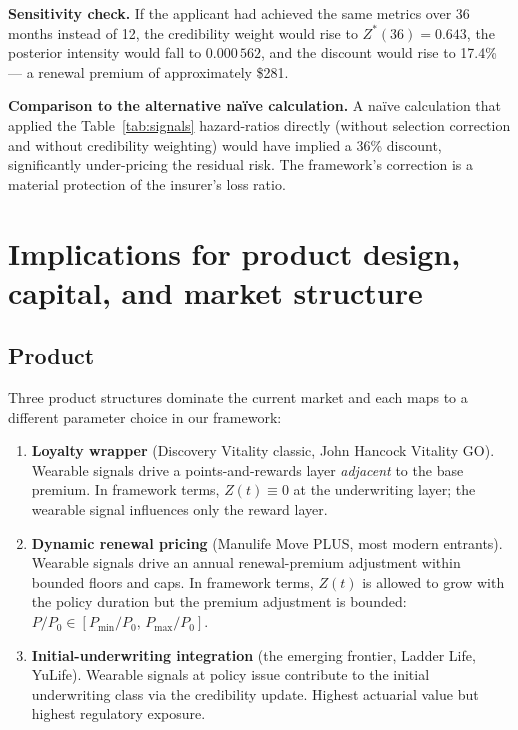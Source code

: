 \begin{ebox}
\textbf{Sensitivity check.}
If the applicant had achieved the same metrics over 36 months
instead of 12, the credibility weight would rise to
$Z^*(36)=0.643$, the posterior intensity would fall to
$0.000\,562$, and the discount would rise to 17.4\% --- a renewal
premium of approximately \$281.

\textbf{Comparison to the alternative naïve calculation.}
A naïve calculation that applied the Table~\ref{tab:signals}
hazard-ratios directly (without selection correction and without
credibility weighting) would have implied a 36\% discount,
significantly under-pricing the residual risk. The framework's
correction is a material protection of the insurer's loss ratio.
\end{ebox}

\section{Implications for product design, capital, and market structure}\label{sec:implications}

\subsection{Product}\label{ss:prod-impl}

Three product structures dominate the current market and each maps
to a different parameter choice in our framework:

\begin{enumerate}[leftmargin=*,nosep,topsep=4pt]
   \item \textbf{Loyalty wrapper} (Discovery Vitality
         classic, John Hancock Vitality GO).
         Wearable signals drive a points-and-rewards layer
         \emph{adjacent} to the base premium. In framework terms,
         $Z(t)\equiv 0$ at the underwriting layer; the wearable
         signal influences only the reward layer.
   \item \textbf{Dynamic renewal pricing} (Manulife Move PLUS,
         most modern entrants).
         Wearable signals drive an annual renewal-premium
         adjustment within bounded floors and caps. In framework
         terms, $Z(t)$ is allowed to grow with the policy duration
         but the premium adjustment is bounded:
         $P/P_0 \in [P_{\min}/P_0,\,P_{\max}/P_0]$.
   \item \textbf{Initial-underwriting integration} (the emerging
         frontier, Ladder Life, YuLife).
         Wearable signals at policy issue contribute to the initial
         underwriting class via the credibility update. Highest
         actuarial value but highest regulatory exposure.
\end{enumerate}

